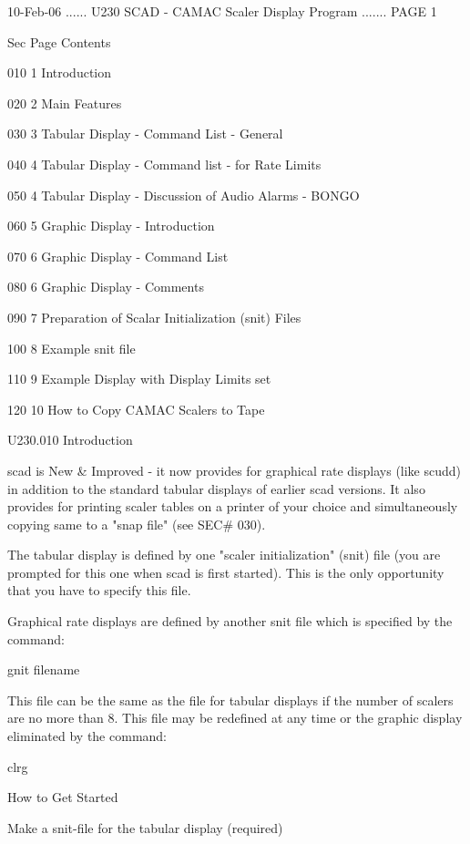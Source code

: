    10-Feb-06 ...... U230  SCAD - CAMAC Scaler Display Program ....... PAGE   1
 
   Sec Page Contents
 
   010   1  Introduction
 
   020   2  Main Features
 
   030   3  Tabular Display - Command List - General
 
   040   4  Tabular Display - Command list - for Rate Limits
 
   050   4  Tabular Display - Discussion of Audio Alarms - BONGO
 
   060   5  Graphic Display - Introduction
 
   070   6  Graphic Display - Command List
 
   080   6  Graphic Display - Comments
 
   090   7  Preparation of Scalar Initialization (snit) Files
 
   100   8  Example snit file
 
   110   9  Example Display with Display Limits set
 
   120  10  How to Copy CAMAC Scalers to Tape
 
 
   U230.010  Introduction
 
   scad  is New & Improved - it now provides for graphical rate displays (like
   scudd) in addition  to  the  standard  tabular  displays  of  earlier  scad
   versions.  It also provides for printing scaler tables on a printer of your
   choice and simultaneously copying same to a "snap file" (see SEC# 030).
 
   The tabular display is defined by one "scaler initialization"  (snit)  file
   (you  are  prompted  for  this one when scad is first started). This is the
   only opportunity that you have to specify this file.
 
   Graphical rate   displays  are  defined  by  another  snit  file  which  is
   specified by the command:
 
   gnit filename
 
   This  file  can  be the same as the file for tabular displays if the number
   of scalers are no more than 8. This file may be redefined at  any  time  or
   the graphic display eliminated by the command:
 
   clrg
 
                               How to Get Started
 
   Make a snit-file for the tabular display (required)
 
